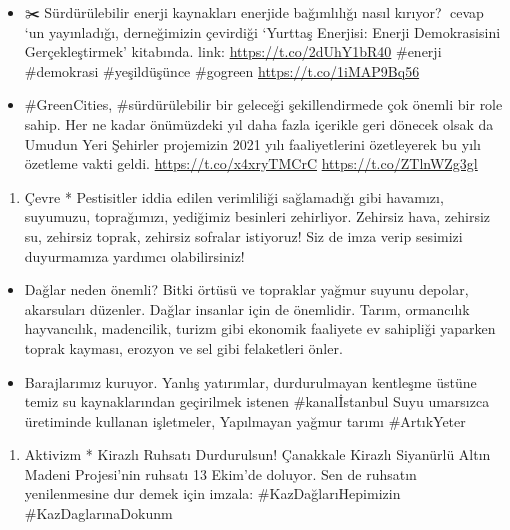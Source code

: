 \documentclass[
]{book}
\providecommand{\tightlist}{%
  \setlength{\itemsep}{0pt}\setlength{\parskip}{0pt}}
\begin{document}
\begin{itemize}
\item
  ✂️ Sürdürülebilir enerji kaynakları enerjide bağımlılığı nasıl kırıyor? 📣cevap \citet{GEF_Europe} `un yayınladığı, derneğimizin çevirdiği `Yurttaş Enerjisi: Enerji Demokrasisini Gerçekleştirmek' kitabında. link: \url{https://t.co/2dUhY1bR40} \#enerji \#demokrasi \#yeşildüşünce \#gogreen \url{https://t.co/1iMAP9Bq56}
\item
  \#GreenCities, \#sürdürülebilir bir geleceği şekillendirmede çok önemli bir role sahip. Her ne kadar önümüzdeki yıl daha fazla içerikle geri dönecek olsak da Umudun Yeri Şehirler projemizin 2021 yılı faaliyetlerini özetleyerek bu yılı özetleme vakti geldi. \url{https://t.co/x4xryTMCrC} \url{https://t.co/ZTlnWZg3gl}
\end{itemize}

\begin{enumerate}
\def\labelenumi{\arabic{enumi})}
\setcounter{enumi}{3}
\tightlist
\item
  Çevre * Pestisitler iddia edilen verimliliği sağlamadığı gibi havamızı, suyumuzu, toprağımızı, yediğimiz besinleri zehirliyor. Zehirsiz hava, zehirsiz su, zehirsiz toprak, zehirsiz sofralar istiyoruz! Siz de imza verip sesimizi duyurmamıza yardımcı olabilirsiniz!
\end{enumerate}

\begin{itemize}
\item
  Dağlar neden önemli? Bitki örtüsü ve topraklar yağmur suyunu depolar, akarsuları düzenler. Dağlar insanlar için de önemlidir. Tarım, ormancılık hayvancılık, madencilik, turizm gibi ekonomik faaliyete ev sahipliği yaparken toprak kayması, erozyon ve sel gibi felaketleri önler.
\item
  Barajlarımız kuruyor. Yanlış yatırımlar, durdurulmayan kentleşme üstüne temiz su kaynaklarından geçirilmek istenen \#kanalİstanbul Suyu umarsızca üretiminde kullanan işletmeler, Yapılmayan yağmur tarımı \#ArtıkYeter \citet{karagozilker} \citet{temavakfi}
\end{itemize}

\begin{enumerate}
\def\labelenumi{\arabic{enumi})}
\setcounter{enumi}{4}
\tightlist
\item
  Aktivizm * Kirazlı Ruhsatı Durdurulsun! Çanakkale Kirazlı Siyanürlü Altın Madeni Projesi'nin ruhsatı 13 Ekim'de doluyor. Sen de ruhsatın yenilenmesine dur demek için imzala: \#KazDağlarıHepimizin \#KazDaglarınaDokunm
\end{enumerate}
\end{document}
